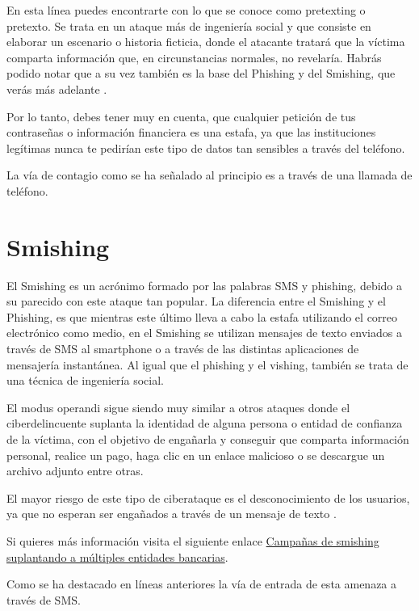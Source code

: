 \documentclass[
  a4paper,
  openany]{book}
\begin{document}
En esta línea puedes encontrarte con lo que se conoce como pretexting o pretexto. Se trata en un ataque más de ingeniería social y que consiste en elaborar un
escenario o historia ficticia, donde el atacante tratará que la víctima comparta información que, en circunstancias normales, no revelaría. Habrás podido notar que a su vez también es la base del Phishing y del Smishing, que verás más adelante \citep{RZ-pretexting}.

Por lo tanto, debes tener muy en cuenta, que cualquier petición de tus contraseñas o información financiera es una estafa, ya que las instituciones legítimas nunca te pedirían este tipo de datos tan sensibles a través del teléfono.

La vía de contagio como se ha señalado al principio es a través de una llamada de teléfono.

\hypertarget{smishing}{%
\section{Smishing}\label{smishing}}

El Smishing es un acrónimo formado por las palabras SMS y phishing, debido a su parecido con este ataque tan popular. La diferencia entre el Smishing y el Phishing, es que mientras este último lleva a cabo la estafa utilizando el correo electrónico como medio, en el Smishing se utilizan mensajes de texto enviados a través de SMS al smartphone o a través de las distintas aplicaciones de mensajería instantánea. Al igual que el phishing y el vishing, también se trata de una técnica de ingeniería social.

El modus operandi sigue siendo muy similar a otros ataques donde el ciberdelincuente suplanta la identidad de alguna persona o entidad de confianza de la víctima, con el objetivo de engañarla y conseguir que comparta información personal, realice un pago, haga clic en un enlace malicioso o se descargue un archivo adjunto entre otras.

El mayor riesgo de este tipo de ciberataque es el desconocimiento de los usuarios, ya que no esperan ser engañados a través de un mensaje de texto \citep{INCI-smishing}.

Si quieres más información visita el siguiente enlace \href{https://www.incibe.es/protege-tu-empresa/avisos-seguridad/campanas-smishing-suplantando-multiples-entidades-bancarias}{Campañas de smishing suplantando a múltiples entidades bancarias}.

Como se ha destacado en líneas anteriores la vía de entrada de esta amenaza a través de SMS.
\end{document}
